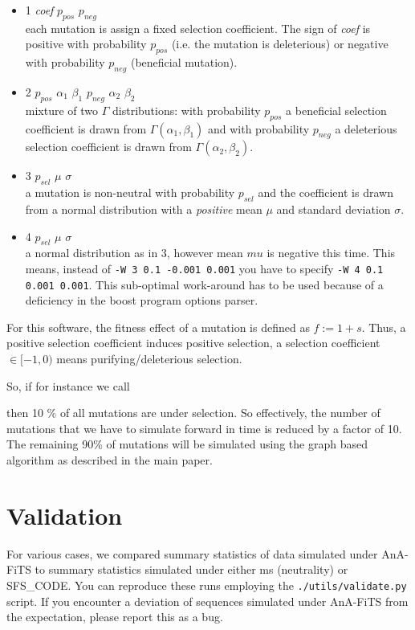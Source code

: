 \documentclass{scrartcl}
\newcommand{\console}[1]{\newline {\footnotesize \texttt{\$ #1}} \newline}
\begin{document}
\begin{itemize}
\item 1 \textit{coef} $p_{pos}$ $p_{neg}$ \\
  each mutation is assign a fixed selection coefficient. The sign of
  \textit{coef} is positive with probability $p_{pos}$ (i.e. the
  mutation is deleterious) or negative with probability $p_{neg}$
  (beneficial mutation).
\item 2 $p_{pos}$ $\alpha_{1}$ $\beta_1$ $p_{neg}$ $\alpha_2$
  $\beta_2$  \\ mixture of two $\Gamma$ distributions: with probability
  $p_{pos}$ a beneficial selection
  coefficient is drawn from $\Gamma(\alpha_1,\beta_1 )$ and with
  probability $p_{neg}$ a deleterious selection coefficient is drawn
  from $\Gamma(\alpha_2,\beta_2 )$.
\item 3  $p_{sel}$ $\mu$ $\sigma$ \\
  a mutation is non-neutral with probability $p_{sel}$ and the
  coefficient is drawn from a normal distribution with a
  \textit{positive} mean $\mu$ and standard deviation $\sigma$.
\item 4  $p_{sel}$ $\mu$ $\sigma$ \\
  a normal distribution as in 3, however mean $mu$ is negative this
  time. This means, instead of \texttt{-W 3 0.1 -0.001 0.001} you have
  to specify \texttt{-W 4 0.1 0.001 0.001}. This sub-optimal
  work-around has to be used because of a deficiency in the boost
  program options parser. 
\end{itemize}

For this software, the fitness effect of a mutation is defined as $ f
:= 1 + s$. Thus, a positive selection coefficient induces positive
selection, a selection coefficient $\in [-1,0)$ means
purifying/deleterious selection. 


So, if for instance we call \console{ ./Anafits -W 2 0.05 10 2000 0.05
  1 500 -n run4 -s 3}

then 10 \% of all mutations are under selection. So effectively, the
number of mutations that we have to simulate forward in time is
reduced by a factor of 10. The remaining 90\% of mutations will be
simulated using the graph based algorithm as described in the main
paper. 


\section{Validation}
\label{sec:validation}

For various cases, we compared summary statistics of data simulated
under AnA-FiTS to summary statistics simulated under either ms
(neutrality) or SFS\_CODE. You can reproduce these runs employing the
\texttt{./utils/validate.py} script. If you encounter a deviation of
sequences simulated under AnA-FiTS from the expectation, please report
this as a bug.
\end{document}
